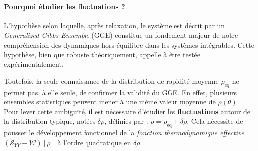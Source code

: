 

\paragraph{Pourquoi étudier les fluctuations ?}

L’hypothèse selon laquelle, après relaxation, le système est décrit par un \textit{Generalized Gibbs Ensemble} (GGE) constitue un fondement majeur de notre compréhension des dynamiques hors équilibre dans les systèmes intégrables. Cette hypothèse, bien que robuste théoriquement, appelle à être testée expérimentalement.

Toutefois, la seule connaissance de la distribution de rapidité moyenne \( \rho_{\mathrm{eq}} \) ne permet pas, à elle seule, de confirmer la validité du GGE. En effet, plusieurs ensembles statistiques peuvent mener à une même valeur moyenne de \( \rho(\theta) \). Pour lever cette ambiguïté, il est nécessaire d’étudier les \textbf{fluctuations} autour de la distribution typique, notées \( \delta \rho \), définies par :
\(
\rho = \rho_{\mathrm{eq}} + \delta \rho.
\)
Cela nécessite de pousser le développement fonctionnel de la \emph{fonction thermodynamique effective} \( (\mathcal{S}_{YY} - \mathcal{W})[\rho] \) à l’ordre quadratique en \( \delta \rho \).

